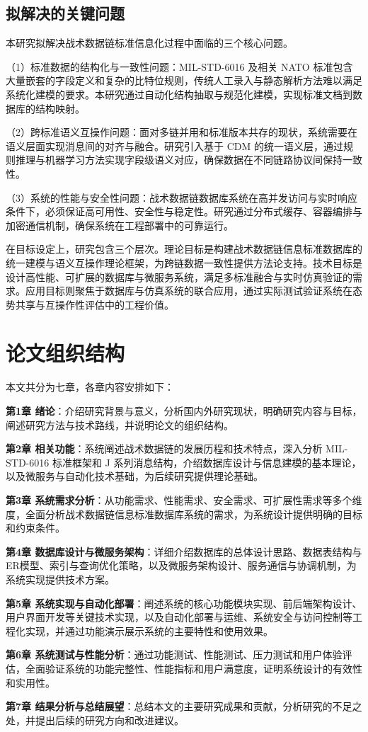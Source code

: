 \subsection{拟解决的关键问题}

本研究拟解决战术数据链标准信息化过程中面临的三个核心问题。

（1）标准数据的结构化与一致性问题：MIL-STD-6016 及相关 NATO 标准包含大量嵌套的字段定义和复杂的比特位规则，传统人工录入与静态解析方法难以满足系统化建模的要求\cite{MIL_STD_6016_Active_2024,SISO_STD_002_2006}。本研究通过自动化结构抽取与规范化建模，实现标准文档到数据库的结构映射。

（2）跨标准语义互操作问题：面对多链并用和标准版本共存的现状，系统需要在语义层面实现消息间的对齐与融合\cite{Hamdan2023Reference,MITRE_Link16_Interoperability_2024}。研究引入基于 CDM 的统一语义层，通过规则推理与机器学习方法实现字段级语义对应，确保数据在不同链路协议间保持一致性。

（3）系统的性能与安全性问题：战术数据链数据库系统在高并发访问与实时响应条件下，必须保证高可用性、安全性与稳定性\cite{Waseem2021Design,MonitoringTools2024}。研究通过分布式缓存、容器编排与加密通信机制，确保系统在工程部署中的可靠运行。

在目标设定上，研究包含三个层次。理论目标是构建战术数据链信息标准数据库的统一建模与语义互操作理论框架，为跨链数据一致性提供方法论支持。技术目标是设计高性能、可扩展的数据库与微服务系统，满足多标准融合与实时仿真验证的需求。应用目标则聚焦于数据库与仿真系统的联合应用，通过实际测试验证系统在态势共享与互操作性评估中的工程价值\cite{SAIC_JRE_Overview_2021,CurtissWright_TCG_HUNTR_2020,DOTE_2022_MIDS_LVT}。

\section{论文组织结构}

本文共分为七章，各章内容安排如下：

\textbf{第1章 绪论}：介绍研究背景与意义，分析国内外研究现状，明确研究内容与目标，阐述研究方法与技术路线，并说明论文的组织结构。

\textbf{第2章 相关功能}：系统阐述战术数据链的发展历程和技术特点，深入分析 MIL-STD-6016 标准框架和 J 系列消息结构，介绍数据库设计与信息建模的基本理论，以及微服务与自动化技术基础，为后续研究提供理论基础。

\textbf{第3章 系统需求分析}：从功能需求、性能需求、安全需求、可扩展性需求等多个维度，全面分析战术数据链信息标准数据库系统的需求，为系统设计提供明确的目标和约束条件。

\textbf{第4章 数据库设计与微服务架构}：详细介绍数据库的总体设计思路、数据表结构与ER模型、索引与查询优化策略，以及微服务架构设计、服务通信与协调机制，为系统实现提供技术方案。

\textbf{第5章 系统实现与自动化部署}：阐述系统的核心功能模块实现、前后端架构设计、用户界面开发等关键技术实现，以及自动化部署与运维、系统安全与访问控制等工程化实现，并通过功能演示展示系统的主要特性和使用效果。

\textbf{第6章 系统测试与性能分析}：通过功能测试、性能测试、压力测试和用户体验评估，全面验证系统的功能完整性、性能指标和用户满意度，证明系统设计的有效性和实用性。

\textbf{第7章 结果分析与总结展望}：总结本文的主要研究成果和贡献，分析研究的不足之处，并提出后续的研究方向和改进建议。
